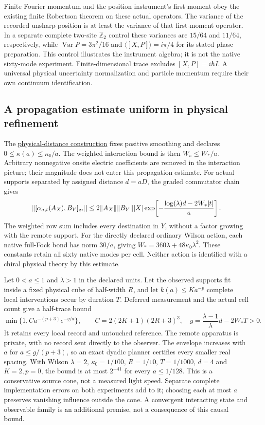 Finite Fourier momentum and the position instrument's first moment
obey the existing finite Robertson theorem on these actual operators.
The variance of the recorded unsharp position is at least the variance
of that first-moment operator. In a separate complete two-site
$\mathbb Z_2$ control these variances are $15/64$ and $11/64$,
respectively, while $\operatorname{Var}P=3\pi^2/16$ and
$\langle[X,P]\rangle=i\pi/4$ for its stated phase preparation.
This control illustrates the instrument algebra; it is not the native
sixty-mode experiment. Finite-dimensional trace excludes
$[X,P]=i\hbar I$. A universal physical uncertainty normalization and
particle momentum require their own continuum identification.

\subsection{A propagation estimate uniform in physical refinement}

The \href{https://github.com/FloatingPragma/observer-patch-holography/blob/main/model/particle_physical_causality/PROOF.md}{physical-distance construction}
fixes positive smoothing and declares $0\le\kappa(a)\le\kappa_0/a$.
The weighted interaction bound is then $W_a\le W_*/a$. Arbitrary
nonnegative onsite electric coefficients are removed in the interaction
picture; their magnitude does not enter this propagation estimate.
For actual supports separated by assigned distance $d=aD$, the graded
commutator chain gives
\[
 \|[\alpha_{a,t}(A_X),B_Y]_{\rm gr}\|
 \le 2\|A_X\|\|B_Y\||X|
       \exp\!\left[-\frac{\log(\lambda)d-2W_*|t|}{a}\right].
\]
The weighted row sum includes every destination in $Y$, without a
factor growing with the remote support. For the directly declared
ordinary Wilson action, each native full-Fock bond has norm $30/a$,
giving $W_*=360\lambda+48\kappa_0\lambda^2$. These constants retain
all sixty native modes per cell. Neither action is identified with a
chiral physical theory by this estimate.

Let $0<a\le1$ and $\lambda>1$ in the declared units. Let the observed
supports fit inside a fixed physical cube of half-width
$R$, and let $k(a)\le K a^{-p}$ complete local interventions occur by
duration $T$. Deferred measurement and the actual cell count give a
half-trace bound
\[
 \min\{1,Ca^{-(p+3)}e^{-g/a}\},\qquad
 C=2(2K+1)(2R+3)^3,\quad
 g=\frac{\lambda-1}{\lambda}d-2W_*T>0.
\]
It retains every local record and untouched reference. The remote
apparatus is private, with no record sent directly to the observer.
The envelope increases with $a$ for $a\le g/(p+3)$, so an exact dyadic
planner certifies every smaller real spacing. With Wilson
$\lambda=2$, $\kappa_0=1/100$, $R=1/10$, $T=1/1000$, $d=4$ and
$K=2,p=0$, the bound is at most $2^{-41}$ for every $a\le1/128$.
This is a conservative source cone, not a measured light speed.
Separate complete implementation errors on both experiments add to it;
choosing each at most $a$ preserves vanishing influence outside the
cone. A convergent interacting state and observable family is an
additional premise, not a consequence of this causal bound.

